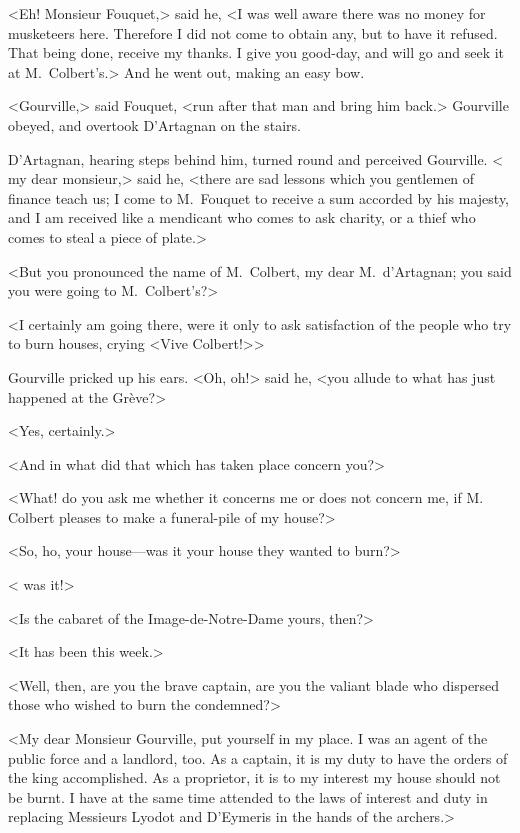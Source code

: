 <Eh! Monsieur Fouquet,> said he, <I was well aware there was no money for musketeers here. Therefore I did not come to obtain any, but to have it refused. That being done, receive my thanks. I give you good-day, and will go and seek it at M.~Colbert's.> And he went out, making an easy bow.

<Gourville,> said Fouquet, <run after that man and bring him back.> Gourville obeyed, and overtook D'Artagnan on the stairs.

D'Artagnan, hearing steps behind him, turned round and perceived Gourville. < my dear monsieur,> said he, <there are sad lessons which you gentlemen of finance teach us; I come to M.~Fouquet to receive a sum accorded by his majesty, and I am received like a mendicant who comes to ask charity, or a thief who comes to steal a piece of plate.>

<But you pronounced the name of M.~Colbert, my dear M.~d'Artagnan; you said you were going to M.~Colbert's?>

<I certainly am going there, were it only to ask satisfaction of the people who try to burn houses, crying <Vive Colbert!>>

Gourville pricked up his ears. <Oh, oh!> said he, <you allude to what has just happened at the Grève?>

<Yes, certainly.>

<And in what did that which has taken place concern you?>

<What! do you ask me whether it concerns me or does not concern me, if M.~ Colbert pleases to make a funeral-pile of my house?>

<So, ho, your house—was it your house they wanted to burn?>

< was it!>

<Is the cabaret of the Image-de-Notre-Dame yours, then?>

<It has been this week.>

<Well, then, are you the brave captain, are you the valiant blade who dispersed those who wished to burn the condemned?>

<My dear Monsieur Gourville, put yourself in my place. I was an agent of the public force and a landlord, too. As a captain, it is my duty to have the orders of the king accomplished. As a proprietor, it is to my interest my house should not be burnt. I have at the same time attended to the laws of interest and duty in replacing Messieurs Lyodot and D'Eymeris in the hands of the archers.>

